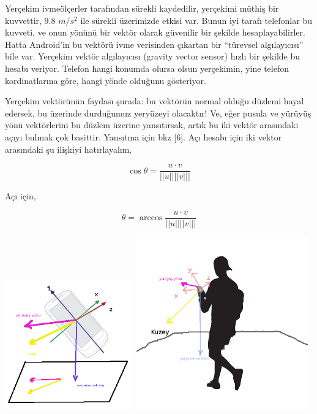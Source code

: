 \documentclass[12pt,fleqn]{article}\usepackage{../../common}
\begin{document}
Yerçekim ivmeölçerler tarafından sürekli kaydedilir, yerçekimi müthiş bir
kuvvettir, 9.8 $m/s^2$ ile sürekli üzerimizde etkisi var. Bunun iyi tarafı
telefonlar bu kuvveti, ve onun yönünü bir vektör olarak güvenilir bir
şekilde hesaplayabilirler. Hatta Android'in bu vektörü ivme verisinden
çıkartan bir ``türevsel algılayıcısı'' bile var. Yerçekim vektör
algılayıcısı (gravity vector sensor) hızlı bir şekilde bu hesabı
veriyor. Telefon hangi konumda olursa olsun yerçekimin, yine telefon
kordinatlarına göre, hangi yönde olduğunu gösteriyor.

Yerçekim vektörünün faydası şurada: bu vektörün normal olduğu düzlemi hayal
edersek, bu üzerinde durduğumuz yeryüzeyi olacaktır! Ve, eğer pusula ve
yürüyüş yönü vektörlerini bu düzlem üzerine yansıtırsak, artık bu iki
vektör arasındaki açıyı bulmak çok basittir. Yansıtma için bkz [6]. Açı
hesabı için iki vektor arasındaki şu ilişkiyi hatırlayalım,

$$ \cos \theta = \frac{u \cdot v}{||u||||v|||}$$

Açı için,

$$ \theta = \arccos \frac{u \cdot v}{||u||||v|||}$$

\includegraphics[width=15em]{compscieng_app40walk_15.png}
\includegraphics[width=20em]{compscieng_app40walk_12.png}
\end{document}

